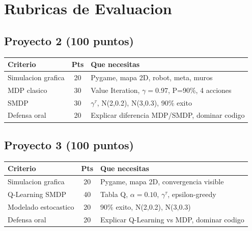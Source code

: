 \documentclass[11pt,a4paper]{article}
\begin{document}
\newpage

\section{Rubricas de Evaluacion}

\subsection{Proyecto 2 (100 puntos)}

\begin{center}
\begin{tabular}{l c l}
\toprule
\rowcolor{tabheader}
Criterio & Pts & Que necesitas \\
\midrule
Simulacion grafica & 20 & Pygame, mapa 2D, robot, meta, muros \\
MDP clasico & 30 & Value Iteration, $\gamma=0.97$, P=90\%, 4 acciones \\
SMDP & 30 & $\gamma^\tau$, N(2,0.2), N(3,0.3), 90\% exito \\
Defensa oral & 20 & Explicar diferencia MDP/SMDP, dominar codigo \\
\bottomrule
\end{tabular}
\end{center}

\subsection{Proyecto 3 (100 puntos)}

\begin{center}
\begin{tabular}{l c l}
\toprule
\rowcolor{tabheader}
Criterio & Pts & Que necesitas \\
\midrule
Simulacion grafica & 20 & Pygame, mapa 2D, convergencia visible \\
Q-Learning SMDP & 40 & Tabla Q, $\alpha=0.10$, $\gamma^\tau$, epsilon-greedy \\
Modelado estocastico & 20 & 90\% exito, N(2,0.2), N(3,0.3) \\
Defensa oral & 20 & Explicar Q-Learning vs MDP, dominar codigo \\
\bottomrule
\end{tabular}
\end{center}

\newpage

\end{document}
